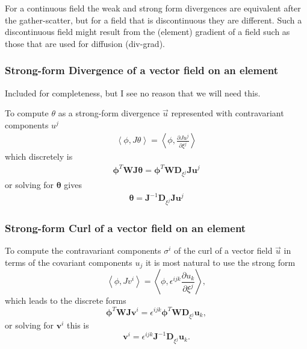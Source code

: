 \documentclass{report}
\newcommand{\inner}[2]{ \left\langle #1, #2 \right\rangle }
\newcommand{\mat}[1]{\boldsymbol #1}
\newcommand{\dvec}[1]{\boldsymbol #1}
\begin{document}
For a continuous field the weak and strong form divergences are equivalent after the gather-scatter,
but for a field that is discontinuous they are different.
Such a discontinuous field might result from the (element) gradient of a field such as those that are used
for diffusion (div-grad).

\subsubsection*{Strong-form Divergence of a vector field on an element}
Included for completeness, but I see no reason that we will need this.

To compute $\theta$ as a strong-form divergence $\vec{u}$ represented with contravariant components $u^j$
\begin{align}
   \inner{\phi}{J\theta}
   =
   \inner{\phi}{\frac{\partial Ju^j}{\partial \xi^j}}
\end{align}
which discretely is
\begin{align}
   \dvec{\phi}^{T} \mat{W} \mat{J} \dvec{\theta}
   =
   \dvec{\phi}^{T} \mat{W} \mat{D}_{\xi^j} \mat{J} \dvec{u^{j}}
\end{align}
or solving for $\dvec{\theta}$ gives
\begin{align}
   \dvec{\theta}
   =
   \mat{J}^{-1} \mat{D}_{\xi^j} \mat{J} \dvec{u^{j}}
\end{align}

\subsubsection*{Strong-form Curl of a vector field on an element}
To compute the contravariant components $\sigma^i$ of the curl of a vector field $\vec{u}$ in terms
of the covariant components $u_j$ it is most natural to use the strong form
\begin{equation}
   \inner{\phi}{J v^i} = \inner{\phi}{\epsilon^{ijk} \frac{\partial u_k}{\partial \xi^j}},
\end{equation}
which leads to the discrete forms
\begin{equation}
   \dvec{\phi}^{T} \mat{W} \mat{J} \dvec{v}^i = \epsilon^{ijk} \dvec{\phi}^{T} \mat{W} \mat{D}_{\xi^j} \dvec{u}_{k},
\end{equation}
or solving for $\dvec{v}^i$ this is
\begin{equation}
   \dvec{v}^i = \epsilon^{ijk} \mat{J}^{-1} \mat{D}_{\xi^j} \dvec{u}_{k}.
\end{equation}
\end{document}
